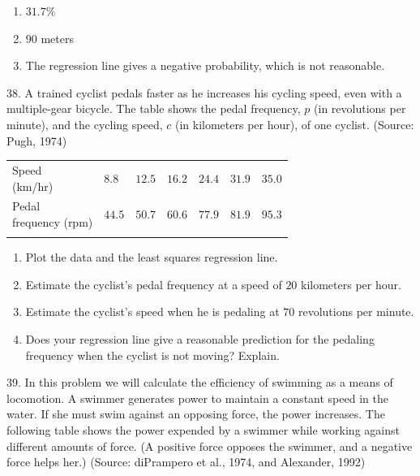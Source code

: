 \documentclass[10pt,]{book}
\makeatletter
\theoremstyle{plain}
\theoremstyle{definition}
\theoremstyle{definition}
\theoremstyle{definition}
\theoremstyle{definition}
\numberwithin{equation}{part}
\newcommand{\hrulethin}  {\noalign{\hrule height 0.04em}}
\newcommand{\tablecelllines}[3]%
{\begin{tabular}[#2]{@{}#1@{}}#3\end{tabular}}
\makeatother
\begin{document}
\begin{exerciselist}
\begin{multicols}{2}
\begin{enumerate}[label=*\alph**]
%
\item\hypertarget{li-1487}{}\(31.7\%\)%
\item\hypertarget{li-1488}{}\(90\) meters%
\item\hypertarget{li-1489}{}The regression line gives a negative probability, which is not reasonable.%
\end{enumerate}
\end{multicols}
%
\item[38.]\hypertarget{exercise-394}{}A trained cyclist pedals faster as he increases his cycling speed, even with a multiple-gear bicycle. The table shows the pedal frequency, \(p\) (in revolutions per minute), and the cycling speed, \(c\) (in kilometers per hour), of one cyclist. (Source: Pugh, 1974) \begin{table}
\centering
\begin{tabular}{AlA}\hrulethin
\tablecelllines{l}{m}
{Speed\\
(km/hr)}
&\(8.8\)&\(12.5\)&\(16.2\)&\(24.4\)&\(31.9\)&\(35.0\)\tabularnewline\hrulethin
\tablecelllines{l}{m}
{Pedal\\
frequency (rpm)}
&\(44.5\)&\(50.7\)&\(60.6\)&\(77.9\)&\(81.9\)&\(95.3\)\tabularnewline\hrulethin
\end{tabular}
\end{table}
 \leavevmode%
\begin{enumerate}[label=*\alph**]
\item\hypertarget{li-1490}{}Plot the data and the least squares regression line.%
\item\hypertarget{li-1491}{}Estimate the cyclist's pedal frequency at a speed of \(20\) kilometers per hour.%
\item\hypertarget{li-1492}{}Estimate the cyclist's speed when he is pedaling at \(70\) revolutions per minute.%
\item\hypertarget{li-1493}{}Does your regression line give a reasonable prediction for the pedaling frequency when the cyclist is not moving? Explain.%
\end{enumerate}
%
\par\smallskip
\item[39.]\hypertarget{exercise-395}{}In this problem we will calculate the efficiency of swimming as a means of locomotion. A swimmer generates power to maintain a constant speed in the water. If she must swim against an opposing force, the power increases. The following table shows the power expended by a swimmer while working against different amounts of force. (A positive force opposes the swimmer, and a negative force helps her.) (Source: diPrampero et al., 1974, and Alexander, 1992) \leavevmode%

\end{exerciselist}
\end{document}
